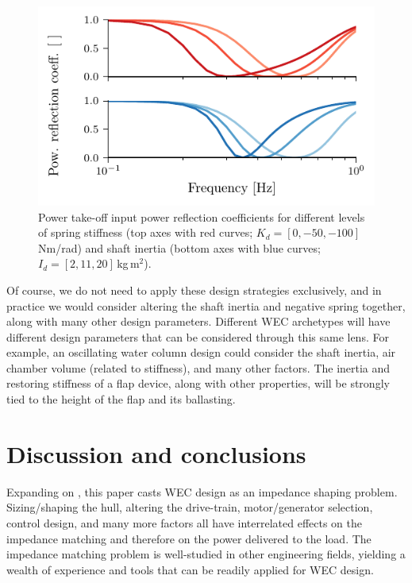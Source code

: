 \documentclass[twocolumn]{autart}
\begin{document}
\begin{figure}[tb]
        \centering
        \includegraphics[width=1\columnwidth]{wec_as_multiport_spring_inertia_power_reflection_coefficient.pdf}
        \caption{Power take-off input power reflection coefficients for different levels of spring stiffness (top axes with red curves; $K_d=[0, -50, -100]$\,Nm/rad) and shaft inertia (bottom axes with blue curves; $I_d=[2, 11, 20]$\,kg\,m$^2$).}
        \label{wec_as_multiport_spring_inertia_power_reflection_coefficient}
\end{figure}

Of course, we do not need to apply these design strategies exclusively, and in practice we would consider altering the shaft inertia and negative spring together, along with many other design parameters.
Different WEC archetypes will have different design parameters that can be considered through this same lens.
For example, an oscillating water column design could consider the shaft inertia, air chamber volume (related to stiffness), and many other factors.
The inertia and restoring stiffness of a flap device, along with other properties, will be strongly tied to the height of the flap and its ballasting.

\section{Discussion and conclusions}
Expanding on \cite{Bacelli:2021aa}, this paper casts WEC design as an impedance shaping problem.
Sizing/shaping the hull, altering the drive-train, motor/generator selection, control design, and many more factors all have interrelated effects on the impedance matching and therefore on the power delivered to the load.
The impedance matching problem is well-studied in other engineering fields, yielding a wealth of experience and tools that can be readily applied for WEC design.
\end{document}

